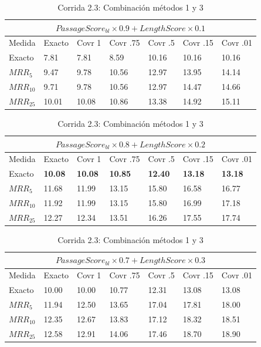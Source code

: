 \begin{table}
\centering
\begin{center}
\begin{tabular}{|l | l | l | l | l | l | l |}
\hline
\multicolumn{7}{|c|}{ $PassageScore_{bl} \times 0.9 + LengthScore \times 0.1$ }  \\ \hline
Medida & Exacto & Covr 1 & Covr .75 & Covr .5 & Covr .15 & Covr .01 \\ \hline
Exacto & 7.81 & 7.81 & 8.59 & 10.16 & 10.16 & 10.16  \\ \hline
$MRR_{5}$ & 9.47 & 9.78 & 10.56 & 12.97 & 13.95 & 14.14  \\ \hline
$MRR_{10}$ & 9.71 & 9.78 & 10.56 & 12.97 & 14.47 & 14.66  \\ \hline
$MRR_{25}$ & 10.01 & 10.08 & 10.86 & 13.38 & 14.92 & 15.11  \\ \hline
\end{tabular}

\medskip

\begin{tabular}{|l | l | l | l | l | l | l |}
\hline
\multicolumn{7}{|c|}{ $PassageScore_{bl} \times 0.8 + LengthScore \times 0.2$ }  \\ \hline
Medida & Exacto & Covr 1 & Covr .75 & Covr .5 & Covr .15 & Covr .01 \\ \hline
Exacto & \textbf{10.08} & \textbf{10.08} & \textbf{10.85} & \textbf{12.40} & \textbf{13.18} & \textbf{13.18}  \\ \hline
$MRR_{5}$ & 11.68 & 11.99 & 13.15 & 15.80 & 16.58 & 16.77  \\ \hline
$MRR_{10}$ & 11.92 & 11.99 & 13.15 & 15.80 & 16.99 & 17.18  \\ \hline
$MRR_{25}$ & 12.27 & 12.34 & 13.51 & 16.26 & 17.55 & 17.74  \\ \hline
\end{tabular}

\medskip

\begin{tabular}{|l | l | l | l | l | l | l |}
\hline
\multicolumn{7}{|c|}{$PassageScore_{bl} \times 0.7 + LengthScore \times 0.3$}  \\ \hline
Medida & Exacto & Covr 1 & Covr .75 & Covr .5 & Covr .15 & Covr .01 \\ \hline
Exacto & 10.00 & 10.00 & 10.77 & 12.31 & 13.08 & 13.08  \\ \hline
$MRR_{5}$ & 11.94 & 12.50 & 13.65 & 17.04 & 17.81 & 18.00  \\ \hline
$MRR_{10}$ & 12.35 & 12.67 & 13.83 & 17.12 & 18.32 & 18.51  \\ \hline
$MRR_{25}$ & 12.58 & 12.91 & 14.06 & 17.46 & 18.70 & 18.90  \\ \hline
\end{tabular}
\caption{Corrida 2.3: Combinación métodos 1 y 3}

\label{table:2_4_broken_ref}
\end{center}
\end{table}


